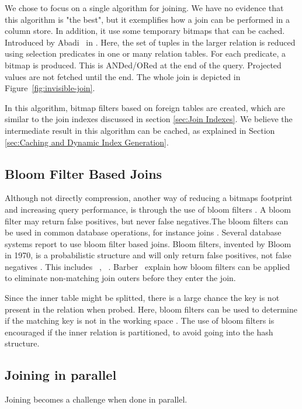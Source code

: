 We chose to focus on a single algorithm for joining. We have no evidence that this algorithm is "the best", but it exemplifies how a join can be performed in a column store. In addition, it use some temporary bitmaps that can be cached. Introduced by Abadi \ea~in  \cite{Abadi2008-dd}. Here, the set of tuples in the larger relation is reduced using selection predicates in one or many relation tables. For each predicate, a bitmap is produced. This is ANDed/ORed at the end of the query. Projected values are not fetched until the end. The whole join is depicted in Figure~\ref{fig:invisible-join}.

In this algorithm, bitmap filters based on foreign tables are created, which are similar to the join indexes discussed in section \ref{sec:Join Indexes}. We believe the intermediate result in this algorithm can be cached, as explained in Section \ref{sec:Caching and Dynamic Index Generation}.

\subsection{Bloom Filter Based Joins}
\label{sub:Bloom Filter Based Joins}
Although not directly compression, another way of reducing a bitmaps footprint and increasing query performance, is through the use of bloom filters \cite{Bloom1970-nr}. A bloom filter may return false positives, but never false negatives.The bloom filters can be used in common database operations, for instance joins \cite{x} . Several database systems report to use bloom filter based joins. Bloom filters, invented by Bloom in 1970, is a probabilistic structure and will only return false positives, not false negatives \cite{Bloom1970-nr}. This includes \oracle~\cite{Lahiri2015-mz}, \ibm~\cite{Raman2013-em}. Barber \ea~explain how bloom filters can be applied to eliminate non-matching join outers before they enter the join.

Since the inner table might be splitted, there is a large chance the key is not present in the relation when probed. Here, bloom filters can be used to determine if the matching key is not in the working space \cite{Bratbergsengen2015}. The use of bloom filters is encouraged if the inner relation is partitioned, to avoid going into the hash structure.

\subsection{Joining in parallel}
\label{sub:Joining in parallel}
Joining becomes a challenge when done in parallel.

